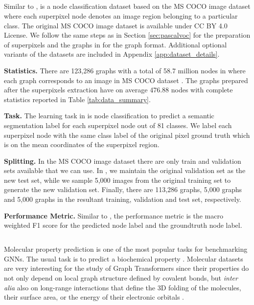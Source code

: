 \documentclass{article}
\begin{document}
\subsection{\coco}
Similar to \pascal, \coco is a node classification dataset based on the MS COCO image dataset \cite{lin2014microsoft} where each superpixel node denotes an image region belonging to a particular class. The original MS COCO image dataset is available under CC BY 4.0 License. We follow the same steps as in Section \ref{sec:pascalvoc} for the preparation of superpixels and the graphs in \coco for the \rbgraph graph format. Additional optional variants of the \coco datasets are included in Appendix \ref{app:dataset_details}.

\textbf{Statistics.} 
There are 123,286 graphs with a total of 58.7 million nodes in \coco where each graph corresponds to an image in MS COCO dataset \cite{lin2014microsoft}. The graphs prepared after the superpixels extraction have on average 476.88 nodes with complete statistics reported in Table \ref{tab:data_summary}.

\textbf{Task.} 
The learning task in \coco is node classification to predict a semantic segmentation label for each superpixel node out of 81 classes. We label each superpixel node with the same class label of the original pixel ground truth which is on the mean coordinates of the superpixel region.

\textbf{Splitting.}
In the MS COCO image dataset there are only train and validation sets available that we can use. In \coco, we maintain the original validation set as the new test set, while we sample 5,000 images from the original training set to generate the new validation set. Finally, there are 113,286 graphs, 5,000 graphs and 5,000 graphs in the resultant training, validation and test set, respectively.

\textbf{Performance Metric.} Similar to \pascal, the performance metric is the macro weighted F1 score for the predicted node label and the groundtruth node label.

\subsection{\pcqmcontact}
Molecular property prediction is one of the most popular tasks for benchmarking GNNs.
The usual task is to predict a biochemical property \cite{hu2020open, dwivedi2020benchmarking}.
Molecular datasets are very interesting for the study of Graph Transformers since their properties do not only depend on local graph structure defined by covalent bonds, but \textit{inter alia} also on long-range interactions that define the 3D folding of the molecules, their surface area, or the energy of their electronic orbitals \cite{ying2021graphormer,liu2022pretraining,stark2022-3d}.
\end{document}
